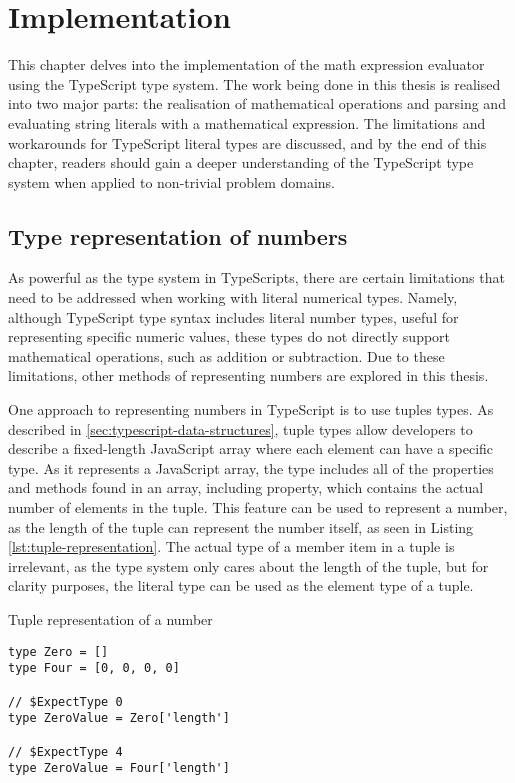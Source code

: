 \chapter{Implementation}

This chapter delves into the implementation of the math expression evaluator using the TypeScript type system. The work being done in this thesis is realised into two major parts: the realisation of mathematical operations and parsing and evaluating string literals with a mathematical expression. The limitations and workarounds for TypeScript literal types are discussed, and by the end of this chapter, readers should gain a deeper understanding of the TypeScript type system when applied to non-trivial problem domains.

\section{Type representation of numbers}

As powerful as the type system in TypeScripts, there are certain limitations that need to be addressed when working with literal numerical types. Namely, although TypeScript type syntax includes literal number types, useful for representing specific numeric values, these types do not directly support mathematical operations, such as addition or subtraction. Due to these limitations, other methods of representing numbers are explored in this thesis.

One approach to representing numbers in TypeScript is to use tuples types. As described in \ref{sec:typescript-data-structures}, tuple types allow developers to describe a fixed-length JavaScript array where each element can have a specific type. As it represents a JavaScript array, the type includes all of the properties and methods found in an array, including  property, which contains the actual number of elements in the tuple. This feature can be used to represent a number, as the length of the tuple can represent the number itself, as seen in Listing \ref{lst:tuple-representation}. The actual type of a member item in a tuple is irrelevant, as the type system only cares about the length of the tuple, but for clarity purposes, the literal type  can be used as the element type of a tuple.

\begin{listing}[ht]
\caption{Tuple representation of a number}\label{lst:tuple-representation}
\begin{verbatim}
type Zero = []
type Four = [0, 0, 0, 0] 

// $ExpectType 0
type ZeroValue = Zero['length']

// $ExpectType 4
type ZeroValue = Four['length']
\end{verbatim}
\end{listing}

